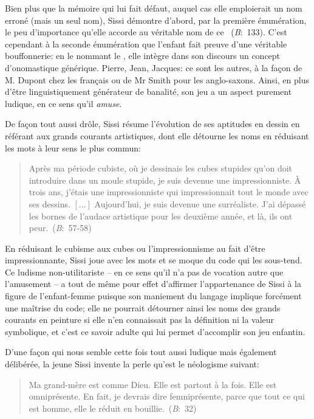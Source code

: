 \par
Bien plus que la mémoire qui lui fait défaut, auquel cas elle emploierait un nom erroné (mais un seul nom), Sissi démontre d'abord, par la première énumération, le peu d'importance qu'elle accorde au véritable nom de ce ~(\textit{B}:~133).
C'est cependant à la seconde énumération que l'enfant fait preuve d'une véritable bouffonnerie: en le nommant le , elle intègre dans son discours un concept d'onomastique générique.
Pierre, Jean, Jacques: ce sont les autres, à la façon de M. Dupont chez les français ou de Mr Smith pour les anglo-saxons.
Ainsi, en plus d'être linguistiquement générateur de banalité, son jeu a un aspect purement ludique, en ce sens qu'il \textit{amuse}.
\par
De façon tout aussi drôle, Sissi résume l'évolution de ses aptitudes en dessin en référant aux grands courants artistiques, dont elle détourne les noms en réduisant les mots à leur sens le plus commun:
\begin{quote}
  \begin{singlespace}
    \small
    Après ma période cubiste, où je dessinais les cubes stupides qu'on doit introduire dans un moule stupide, je suis devenue une impressionniste. À trois ans, j'étais une impressionniste qui impressionnait tout le monde avec ses dessins. $\left[ \dots \right]$ Aujourd'hui, je suis devenue une surréaliste. J'ai dépassé les bornes de l'audace artistique pour les deuxième année, et là, ils ont peur.~(\textit{B}:~57-58)
    \normalsize
  \end{singlespace}
\end{quote}
En réduisant le cubisme aux cubes ou l'impressionnisme au fait d'être impressionnante, Sissi joue avec les mots et se moque du code qui les sous-tend.
Ce ludisme non-utilitariste -- en ce sens qu'il n'a pas de vocation autre que l'amusement -- a tout de même pour effet d'affirmer l'appartenance de Sissi à la figure de l'enfant-femme puisque son maniement du langage implique forcément une maîtrise du code; elle ne pourrait détourner ainsi les noms des grands courants en peinture si elle n'en connaissait pas la définition ni la valeur symbolique, et c'est ce savoir adulte qui lui permet d'accomplir son jeu enfantin.
\par
D'une façon qui nous semble cette fois tout aussi ludique mais également délibérée, la jeune Sissi invente la perle qu'est le néologisme suivant:
\begin{quote}
  \begin{singlespace}
    \small
    Ma grand-mère est comme Dieu. Elle est partout à la fois. Elle est omniprésente. En fait, je devrais dire femniprésente, parce que tout ce qui est homme, elle le réduit en bouillie.~(\textit{B}:~32)
    \normalsize
  \end{singlespace}
\end{quote}
